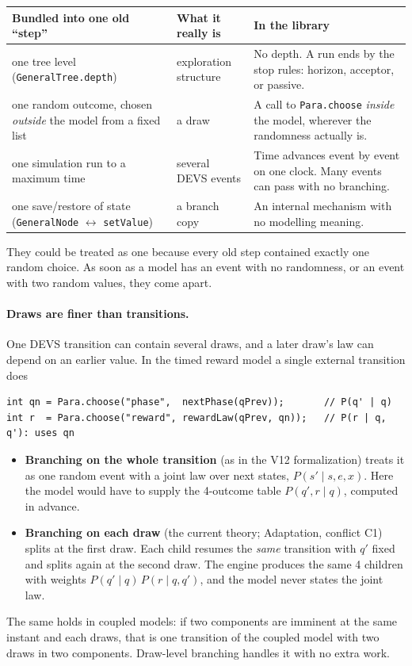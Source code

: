 \documentclass[11pt]{article}
\newcommand{\code}[1]{\texttt{#1}}
\begin{document}
\begin{center}
\small
\begin{tabularx}{\linewidth}{@{}>{\raggedright\arraybackslash}p{5.2cm} >{\raggedright\arraybackslash}p{3.2cm} Y@{}}
\toprule
\textbf{Bundled into one old ``step''} & \textbf{What it really is} & \textbf{In the library}\\
\midrule
one tree level (\code{GeneralTree.depth}) & exploration structure & No depth. A run ends by the stop rules: horizon, acceptor, or passive.\\
one random outcome, chosen \emph{outside} the model from a fixed list & a draw & A call to \code{Para.choose} \emph{inside} the model, wherever the randomness actually is.\\
one simulation run to a maximum time & several DEVS events & Time advances event by event on one clock. Many events can pass with no branching.\\
one save/restore of state (\code{GeneralNode} $\leftrightarrow$ \code{setValue}) & a branch copy & An internal mechanism with no modelling meaning.\\
\bottomrule
\end{tabularx}
\end{center}
They could be treated as one because every old step contained exactly one random choice. As soon as a model has an event
with no randomness, or an event with two random values, they come apart.

\paragraph{Draws are finer than transitions.} One DEVS transition can contain several draws, and a later draw's law can
depend on an earlier value. In the timed reward model a single external transition does
\begin{lstlisting}
int qn = Para.choose("phase",  nextPhase(qPrev));       // P(q' | q)
int r  = Para.choose("reward", rewardLaw(qPrev, qn));   // P(r | q, q'): uses qn
\end{lstlisting}
\begin{itemize}
\item \textbf{Branching on the whole transition} (as in the V12 formalization) treats it as one random event with a
  joint law over next states, $P(s' \mid s, e, x)$. Here the model would have to supply the 4-outcome table
  $P(q', r \mid q)$, computed in advance.
\item \textbf{Branching on each draw} (the current theory; Adaptation, conflict C1) splits at the first draw. Each child
  resumes the \emph{same} transition with $q'$ fixed and splits again at the second draw. The engine produces the same
  4 children with weights $P(q'\mid q)\,P(r \mid q, q')$, and the model never states the joint law.
\end{itemize}
The same holds in coupled models: if two components are imminent at the same instant and each draws, that is one
transition of the coupled model with two draws in two components. Draw-level branching handles it with no extra work.
\end{document}
